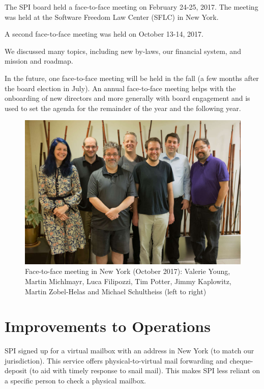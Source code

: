 \documentclass[a4paper]{report}
\begin{document}
The SPI board held a face-to-face meeting on February 24-25, 2017.
The meeting was held at the Software Freedom Law Center (SFLC) in New
York.

A second face-to-face meeting was held on October 13-14, 2017.

We discussed many topics, including new by-laws, our financial system,
and mission and roadmap.

In the future, one face-to-face meeting will be held in the fall (a few
months after the board election in July).  An annual face-to-face
meeting helps with the onboarding of new directors and more generally
with board engagement and is used to set the agenda for the remainder
of the year and the following year.

\begin{figure}[h]
\centering

\includegraphics[scale=1.00]{images/2017-october-f2f}

\caption{Face-to-face meeting in New York (October 2017): Valerie Young,
Martin Michlmayr, Luca Filipozzi, Tim Potter, Jimmy Kaplowitz, Martin
Zobel-Helas and Michael Schultheiss (left to right)}

\end{figure}

\section{Improvements to Operations}

SPI signed up for a virtual mailbox with an address in New York (to
match our jurisdiction).  This service offers physical-to-virtual mail
forwarding and cheque-deposit (to aid with timely response to snail
mail).  This makes SPI less reliant on a specific person to check a
physical mailbox.
\end{document}
